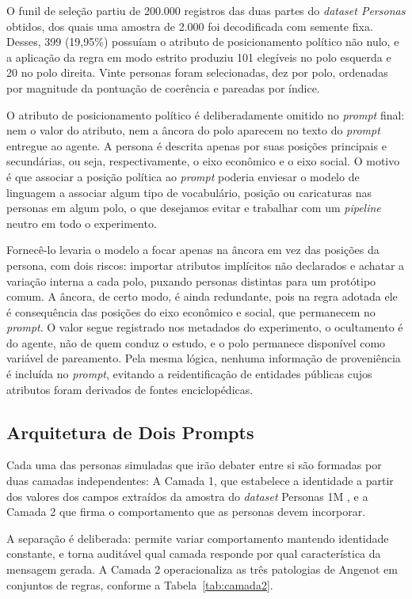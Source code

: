 \documentclass[conference]{IEEEtran} \IEEEoverridecommandlockouts %
\begin{document}
O funil de seleção partiu de 200.000 registros das duas partes do \textit{dataset Personas}
obtidos, dos quais uma amostra de 2.000 foi decodificada com semente fixa.
Desses, 399 (19,95\%) possuíam o atributo de posicionamento político não nulo,
e a aplicação da regra em modo estrito produziu 101 elegíveis no polo esquerda
e 20 no polo direita. Vinte personas foram selecionadas, dez por polo,
ordenadas por magnitude da pontuação de coerência e pareadas por índice.

O atributo de posicionamento político é deliberadamente omitido no
\textit{prompt} final: nem o valor do atributo, nem a âncora do polo aparecem no texto do \textit{prompt} entregue ao agente. A persona é descrita apenas por suas posições principais e secundárias, ou seja, respectivamente, o eixo econômico e o eixo social. O motivo é que associar a posição política ao \textit{prompt} poderia enviesar o modelo de linguagem a associar algum tipo de vocabulário, posição  ou caricaturas nas personas em algum polo, o que desejamos evitar e trabalhar com um \textit{pipeline} neutro em todo o experimento.


Fornecê-lo levaria o modelo a focar apenas na âncora em vez das posições da persona, com dois riscos: importar atributos implícitos não declarados e achatar a variação interna a cada polo, puxando personas distintas para um protótipo comum. A âncora, de certo modo, é ainda redundante, pois na regra adotada ele é consequência das posições do eixo econômico e social, que
permanecem no \textit{prompt}. O valor segue registrado nos metadados do experimento, o
ocultamento é do agente, não de quem conduz o estudo, e o polo permanece
disponível como variável de pareamento. Pela mesma lógica, nenhuma informação
de proveniência é incluída no \textit{prompt}, evitando a reidentificação de entidades
públicas cujos atributos foram derivados de fontes enciclopédicas.

\subsection{Arquitetura de Dois Prompts}

Cada uma das personas simuladas que irão debater entre si são formadas por duas camadas independentes: A Camada 1, que estabelece a identidade a partir dos valores dos campos extraídos da amostra do \textit{dataset} Personas 1M \cite{li2026matraix}, e a Camada 2 que firma o comportamento que as personas devem incorporar.

A separação é deliberada: permite variar comportamento mantendo identidade
constante, e torna auditável qual camada responde por qual característica da
mensagem gerada. A Camada 2 operacionaliza as três patologias de Angenot em
conjuntos de regras, conforme a Tabela~\ref{tab:camada2}.
\end{document}
